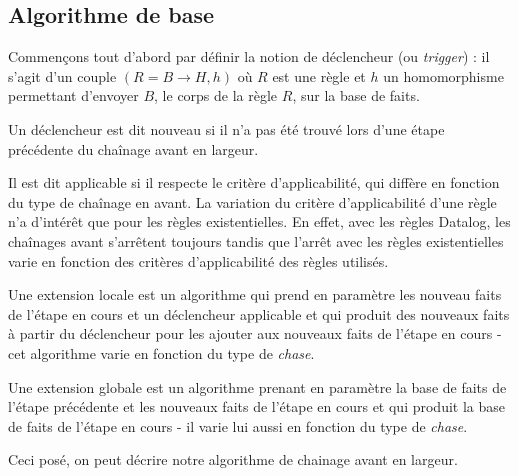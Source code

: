 


\subsection{Algorithme de base}\label{subsec:algo_base_ch_avant}

Commençons tout d'abord par définir la notion de déclencheur (ou \textit{trigger}) : il s'agit d'un couple $(R = B \rightarrow H,h)$ où $R$ est une règle et $h$ un homomorphisme permettant d'envoyer $B$, le corps de la règle $R$, sur la base de faits.
\par Un déclencheur est dit nouveau si il n'a pas été trouvé lors d'une étape précédente du chaînage avant en largeur.
\par Il est dit applicable si il respecte le critère d'applicabilité, qui diffère en fonction du type de chaînage en avant. La variation du critère d'applicabilité d'une règle n'a d'intérêt que pour les règles existentielles. En effet, avec les règles Datalog, les chaînages avant s'arrêtent toujours tandis que l'arrêt avec les règles existentielles varie en fonction des critères d'applicabilité des règles utilisés.
\par Une extension locale est un algorithme qui prend en paramètre les nouveau faits de l'étape en cours et un déclencheur applicable et qui produit des nouveaux faits à partir du déclencheur pour les ajouter aux nouveaux faits de l'étape en cours - cet algorithme varie en fonction du type de \textit{chase}.
\par Une extension globale est un algorithme prenant en paramètre la base de faits de l'étape précédente et les nouveaux faits de l'étape en cours et qui produit la base de faits de l'étape en cours - il varie lui aussi en fonction du type de \textit{chase}.
\par Ceci posé, on peut décrire notre algorithme de chainage avant en largeur.

